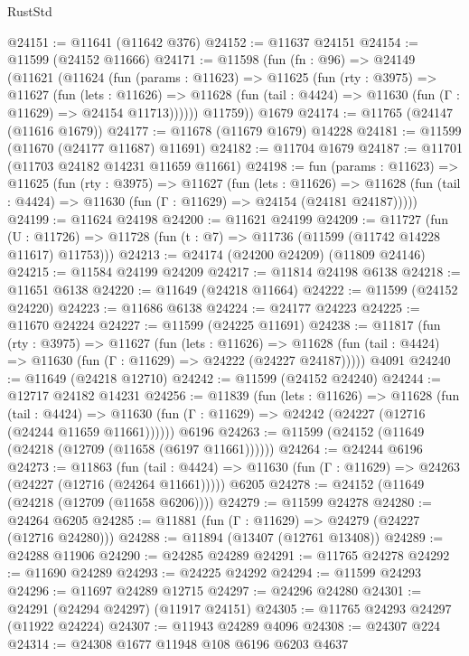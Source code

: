 \begin{lexlean}{RustStd}
\begin{coremodule}
@24151 := @11641 (@11642 @376)
@24152 := @11637 @24151
@24154 := @11599 (@24152 @11666)
@24171 := @11598
    (fun (fn : @96) =>
    @24149
      (@11621
        (@11624
          (fun (params : @11623) =>
          @11625
            (fun (rty : @3975) =>
            @11627
              (fun (lets : @11626) =>
              @11628 (fun (tail : @4424) => @11630 (fun (Γ : @11629) => @24154 @11713))))))
        @11759))
    @1679
@24174 := @11765 (@24147 (@11616 @1679))
@24177 := @11678 (@11679 @1679) @14228
@24181 := @11599 (@11670 (@24177 @11687) @11691)
@24182 := @11704 @1679
@24187 := @11701 (@11703 @24182 @14231 @11659 @11661)
@24198 := fun (params : @11623) =>
  @11625
    (fun (rty : @3975) =>
    @11627
      (fun (lets : @11626) =>
      @11628 (fun (tail : @4424) => @11630 (fun (Γ : @11629) => @24154 (@24181 @24187)))))
@24199 := @11624 @24198
@24200 := @11621 @24199
@24209 := @11727
    (fun (U : @11726) => @11728 (fun (t : @7) => @11736 (@11599 (@11742 @14228 @11617) @11753)))
@24213 := @24174 (@24200 @24209) (@11809 @24146)
@24215 := @11584 @24199 @24209
@24217 := @11814 @24198 @6138
@24218 := @11651 @6138
@24220 := @11649 (@24218 @11664)
@24222 := @11599 (@24152 @24220)
@24223 := @11686 @6138
@24224 := @24177 @24223
@24225 := @11670 @24224
@24227 := @11599 (@24225 @11691)
@24238 := @11817
    (fun (rty : @3975) =>
    @11627
      (fun (lets : @11626) =>
      @11628 (fun (tail : @4424) => @11630 (fun (Γ : @11629) => @24222 (@24227 @24187)))))
    @4091
@24240 := @11649 (@24218 @12710)
@24242 := @11599 (@24152 @24240)
@24244 := @12717 @24182 @14231
@24256 := @11839
    (fun (lets : @11626) =>
    @11628
      (fun (tail : @4424) =>
      @11630 (fun (Γ : @11629) => @24242 (@24227 (@12716 (@24244 @11659 @11661))))))
    @6196
@24263 := @11599 (@24152 (@11649 (@24218 (@12709 (@11658 (@6197 @11661))))))
@24264 := @24244 @6196
@24273 := @11863
    (fun (tail : @4424) => @11630 (fun (Γ : @11629) => @24263 (@24227 (@12716 (@24264 @11661)))))
    @6205
@24278 := @24152 (@11649 (@24218 (@12709 (@11658 @6206))))
@24279 := @11599 @24278
@24280 := @24264 @6205
@24285 := @11881 (fun (Γ : @11629) => @24279 (@24227 (@12716 @24280)))
@24288 := @11894 (@13407 (@12761 @13408))
@24289 := @24288 @11906
@24290 := @24285 @24289
@24291 := @11765 @24278
@24292 := @11690 @24289
@24293 := @24225 @24292
@24294 := @11599 @24293
@24296 := @11697 @24289 @12715
@24297 := @24296 @24280
@24301 := @24291 (@24294 @24297) (@11917 @24151)
@24305 := @11765 @24293 @24297 (@11922 @24224)
@24307 := @11943 @24289 @4096
@24308 := @24307 @224
@24314 := @24308 @1677 @11948 @108 @6196 @6203 @4637

\end{coremodule}
\end{lexlean}
